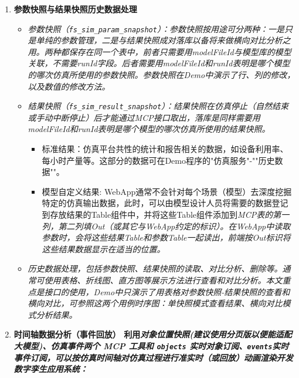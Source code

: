 \begin{enumerate}[label=\arabic*)]
\begin{itemize}
		\item 模型处于 \texttt{RUNNING/PAUSED} 时禁止写参数；新一轮仿真前先 \texttt{reset} 再 \texttt{start}；
		\item 参数快照可落库保存（表 \texttt{fs\_sim\_param\_snapshot}），供事后使用（不同版本的参数快照从数据库中读取，再回写到模型），或对比分析（分析不同版本参数对仿真结果的影响）。
	\end{itemize}
    \item \bf{参数快照与结果快照历史数据处理}\label{sec-history-data}
    \begin{itemize}
        \item \it{参数快照}（\texttt{fs\_sim\_param\_snapshot}）：参数快照按用途可分两种：一是只是单纯的参数管理，二是与结果快照成对落库以备将来做横向对比分析之用。两种都保存在同一个表中，前者只需要用modelFileId与模型库的模型关联，不需要runId字段。后者需要用modelFileId和runId表明是哪个模型的哪次仿真所使用的参数快照。参数快照在Demo中演示了行、列的修改，以及数值的修改方法。  
        \item \it{结果快照}（\texttt{fs\_sim\_result\_snapshot}）：结果快照在仿真停止（自然结束或手动中断停止）后才能通过MCP接口取出，落库是同样需要用modelFileId和runId表明是哪个模型的哪次仿真所使用的结果快照。
        \begin{itemize}
            \item 标准结果：仿真平台共性的统计和报告相关的数据，如设备利用率、每小时产量等。这部分的数据可在Demo程序的"仿真服务"-""历史数据""。
            \item 模型自定义结果: WebApp通常不会针对每个场景（模型）去深度挖掘特定的仿真输出数据，此时，可以由模型设计人员将需要的数据登记到存放结果的Table组件中，并将这些Table组件添加到\it{MCP表}的第一列，第二列填\it{Out}（或其它与WebApp约定的标识）。在WebApp中读取参数时，会将这些结果Table和参数Table一起读出，前端按\it{Out}标识将这些结果数据显示在适当的位置。
        \end{itemize}
        \item \it{历史数据处理}，包括参数快照、结果快照的读取、对比分析、删除等。通常可使用表格、折线图、直方图等展示方法进行查看和对比分析。本文重点是接口的使用，Demo中只演示了用表格对参数快照-结果快照的查看和横向对比，可参照这两个用例时序图：\it{单快照模式查看结果}、\it{横向对比模式分析结果}。
    \end{itemize}
    \item \bf{时间轴数据分析（事件回放）}\label{sec:brief-step9}
	利用\it{对象位置快照}(建议使用\bf{分页版}以便能适配大模型)、\it{仿真事件}两个 MCP 工具和 \texttt{objects} 实时对象订阅、\texttt{events}实时事件订阅，可以按仿真时间轴对仿真过程进行准实时（或回放）动画渲染开发数字孪生应用系统：

\end{enumerate}
